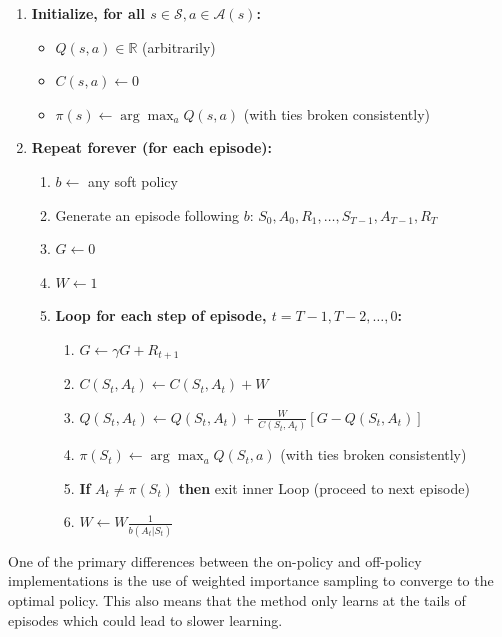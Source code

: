 \documentclass{article}
\begin{document}
\begin{enumerate}
    \item \textbf{Initialize, for all $s \in \mathcal{S}, a \in \mathcal{A}(s)$:}
    \begin{itemize}
        \item $Q(s, a) \in \mathbb{R}$ (arbitrarily)
        \item $C(s, a) \leftarrow 0$
        \item $\pi(s) \leftarrow \arg\max_a Q(s, a)$ \hfill (with ties broken consistently)
    \end{itemize}

    \item \textbf{Repeat forever (for each episode):}
    \begin{enumerate}
        \item $b \leftarrow$ any soft policy
        \item Generate an episode following $b$: $S_0, A_0, R_1, \dots, S_{T-1}, A_{T-1}, R_T$
        \item $G \leftarrow 0$
        \item $W \leftarrow 1$
        \item \textbf{Loop for each step of episode, $t = T-1, T-2, \dots, 0$:}
        \begin{enumerate}
            \item $G \leftarrow \gamma G + R_{t+1}$
            \item $C(S_t, A_t) \leftarrow C(S_t, A_t) + W$
            \item $Q(S_t, A_t) \leftarrow Q(S_t, A_t) + \frac{W}{C(S_t, A_t)} [G - Q(S_t, A_t)]$
            \item $\pi(S_t) \leftarrow \arg\max_a Q(S_t, a)$ \hfill (with ties broken consistently)
            \item \textbf{If} $A_t \neq \pi(S_t)$ \textbf{then} exit inner Loop (proceed to next episode)
            \item $W \leftarrow W \frac{1}{b(A_t|S_t)}$
        \end{enumerate}
    \end{enumerate}
\end{enumerate}
One of the primary differences between the on-policy and off-policy implementations is the use of weighted importance sampling to converge to the optimal policy. This also means that the method only learns at the tails of episodes which could lead to slower learning.
\end{document}
